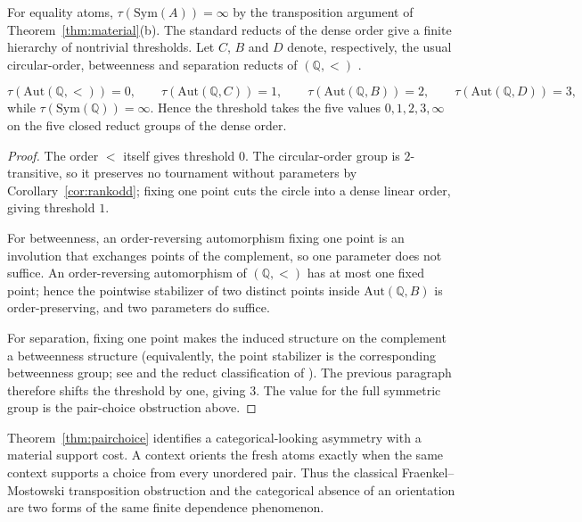 \documentclass{lmcs}
\newcommand{\Sym}{\mathrm{Sym}}
\newcommand{\Aut}{\mathrm{Aut}}
\begin{document}
For equality atoms, $\tau(\Sym(A))=\infty$ by the transposition argument of
Theorem~\ref{thm:material}(b). The standard reducts of the dense order give
a finite hierarchy of nontrivial thresholds. Let $C$, $B$ and $D$ denote,
respectively, the usual circular-order, betweenness and separation reducts
of $(\mathbb Q,<)$ \cite{Cameron76}.

\begin{thm}\label{thm:threshold}
\[
\tau(\Aut(\mathbb Q,<))=0,\qquad
\tau(\Aut(\mathbb Q,C))=1,\qquad
\tau(\Aut(\mathbb Q,B))=2,\qquad
\tau(\Aut(\mathbb Q,D))=3,
\]
while $\tau(\Sym(\mathbb Q))=\infty$. Hence the threshold takes the
five values $0,1,2,3,\infty$ on the five closed reduct groups of the
dense order.
\end{thm}
\begin{proof}
The order $<$ itself gives threshold $0$. The circular-order group is
$2$-transitive, so it preserves no tournament without parameters by
Corollary~\ref{cor:rankodd}; fixing one point cuts the circle into a dense
linear order, giving threshold $1$.

For betweenness, an order-reversing automorphism fixing one point is an
involution that exchanges points of the complement, so one parameter does
not suffice. An order-reversing automorphism of $(\mathbb Q,<)$ has at
most one fixed point; hence the pointwise stabilizer of two distinct points
inside $\Aut(\mathbb Q,B)$ is order-preserving, and two parameters do
suffice.

For separation, fixing one point makes the induced structure on the
complement a betweenness structure (equivalently, the point stabilizer is
the corresponding betweenness group; see \cite[Lem.~2.4(d)]{JunkerZiegler08}
and the reduct classification of \cite{Cameron76}). The previous paragraph
therefore shifts the threshold by one, giving $3$. The value for the full symmetric group is
the pair-choice obstruction above.
\end{proof}

\begin{rem}\label{rem:kinship}
Theorem~\ref{thm:pairchoice} identifies a categorical-looking asymmetry
with a material support cost. A context orients the fresh atoms exactly
when the same context supports a choice from every unordered pair. Thus
the classical Fraenkel--Mostowski transposition obstruction and the
categorical absence of an orientation are two forms of the same finite
dependence phenomenon.
\end{rem}
\end{document}
